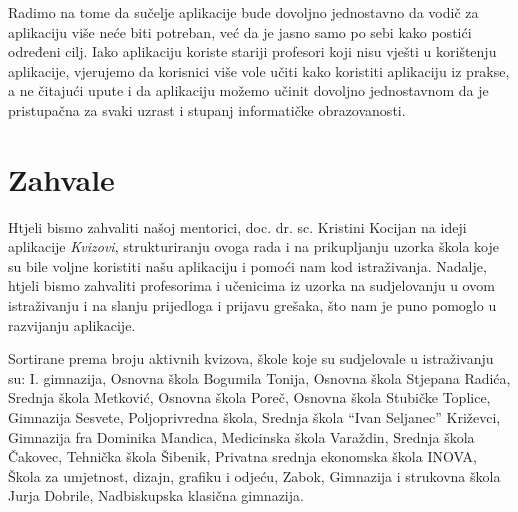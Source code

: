 \documentclass{scrreprt}
\begin{document}
Radimo na tome da sučelje aplikacije bude dovoljno jednostavno da vodič za
aplikaciju više neće biti potreban, već da je jasno samo po sebi kako postići
određeni cilj. Iako aplikaciju koriste stariji profesori koji nisu vješti u
korištenju aplikacije, vjerujemo da korisnici više vole učiti kako koristiti
aplikaciju iz prakse, a ne čitajući upute i da aplikaciju možemo učinit dovoljno
jednostavnom da je pristupačna za svaki uzrast i stupanj informatičke
obrazovanosti.\cite{krug05}

\chapter{Zahvale}

Htjeli bismo zahvaliti našoj mentorici, doc. dr. sc. Kristini Kocijan na ideji
aplikacije \emph{Kvizovi}, strukturiranju ovoga rada i na prikupljanju uzorka
škola koje su bile voljne koristiti našu aplikaciju i pomoći nam kod
istraživanja. Nadalje, htjeli bismo zahvaliti profesorima i učenicima iz uzorka
na sudjelovanju u ovom istraživanju i na slanju prijedloga i prijavu grešaka,
što nam je puno pomoglo u razvijanju aplikacije.

Sortirane prema broju aktivnih kvizova, škole koje su sudjelovale u istraživanju
su: I. gimnazija, Osnovna škola Bogumila Tonija, Osnovna škola Stjepana Radića,
Srednja škola Metković, Osnovna škola Poreč, Osnovna škola Stubičke Toplice,
Gimnazija Sesvete, Poljoprivredna škola, Srednja škola ``Ivan Seljanec''
Križevci, Gimnazija fra Dominika Mandica, Medicinska škola Varaždin, Srednja
škola Čakovec, Tehnička škola Šibenik, Privatna srednja ekonomska škola INOVA,
Škola za umjetnost, dizajn, grafiku i odjeću, Zabok, Gimnazija i strukovna
škola Jurja Dobrile, Nadbiskupska klasična gimnazija.

\renewcommand{\listoffigures}{\begingroup
\tocchapter
{}
\endgroup}

\listoffigures

\renewcommand{\bibname}{Popis literature}
\end{document}
